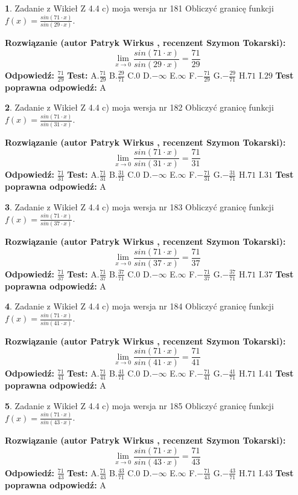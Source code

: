 \documentclass[12pt, a4paper]{article}
\theoremstyle{definition} %
\newtheorem{zad}{}
\newcommand{\zadStart}[1]{\begin{zad}#1\newline}
\newcommand{\zadStop}{\end{zad}}
\newcommand{\rozwStart}[2]{\noindent \textbf{Rozwiązanie (autor #1 , recenzent #2): }\newline}
\newcommand{\rozwStop}{\newline}
\newcommand{\odpStart}{\noindent \textbf{Odpowiedź:}\newline}
\newcommand{\odpStop}{\newline}
\newcommand{\testStart}{\noindent \textbf{Test:}\newline}
\newcommand{\testStop}{\newline}
\newcommand{\kluczStart}{\noindent \textbf{Test poprawna odpowiedź:}\newline}
\newcommand{\kluczStop}{\newline}
\begin{document}
\zadStart{Zadanie z Wikieł Z 4.4 c) moja wersja nr 181}
Obliczyć granicę funkcji $f(x)=\frac{sin(71\cdot x)}{sin(29\cdot x)}$.
\zadStop
\rozwStart{Patryk Wirkus}{Szymon Tokarski}
$$\lim\limits_{x\to 0}\frac{sin(71\cdot x)}{sin(29\cdot x)}=
\frac{71}{29}$$
\rozwStop
\odpStart
$\frac{71}{29}$
\odpStop
\testStart
A.$\frac{71}{29}$
B.$\frac{29}{71}$
C.$0$
D.$-\infty$
E.$\infty$
F.$-\frac{71}{29}$
G.$-\frac{29}{71}$
H.$71$
I.$29$
\testStop
\kluczStart
A
\kluczStop



\zadStart{Zadanie z Wikieł Z 4.4 c) moja wersja nr 182}
Obliczyć granicę funkcji $f(x)=\frac{sin(71\cdot x)}{sin(31\cdot x)}$.
\zadStop
\rozwStart{Patryk Wirkus}{Szymon Tokarski}
$$\lim\limits_{x\to 0}\frac{sin(71\cdot x)}{sin(31\cdot x)}=
\frac{71}{31}$$
\rozwStop
\odpStart
$\frac{71}{31}$
\odpStop
\testStart
A.$\frac{71}{31}$
B.$\frac{31}{71}$
C.$0$
D.$-\infty$
E.$\infty$
F.$-\frac{71}{31}$
G.$-\frac{31}{71}$
H.$71$
I.$31$
\testStop
\kluczStart
A
\kluczStop



\zadStart{Zadanie z Wikieł Z 4.4 c) moja wersja nr 183}
Obliczyć granicę funkcji $f(x)=\frac{sin(71\cdot x)}{sin(37\cdot x)}$.
\zadStop
\rozwStart{Patryk Wirkus}{Szymon Tokarski}
$$\lim\limits_{x\to 0}\frac{sin(71\cdot x)}{sin(37\cdot x)}=
\frac{71}{37}$$
\rozwStop
\odpStart
$\frac{71}{37}$
\odpStop
\testStart
A.$\frac{71}{37}$
B.$\frac{37}{71}$
C.$0$
D.$-\infty$
E.$\infty$
F.$-\frac{71}{37}$
G.$-\frac{37}{71}$
H.$71$
I.$37$
\testStop
\kluczStart
A
\kluczStop



\zadStart{Zadanie z Wikieł Z 4.4 c) moja wersja nr 184}
Obliczyć granicę funkcji $f(x)=\frac{sin(71\cdot x)}{sin(41\cdot x)}$.
\zadStop
\rozwStart{Patryk Wirkus}{Szymon Tokarski}
$$\lim\limits_{x\to 0}\frac{sin(71\cdot x)}{sin(41\cdot x)}=
\frac{71}{41}$$
\rozwStop
\odpStart
$\frac{71}{41}$
\odpStop
\testStart
A.$\frac{71}{41}$
B.$\frac{41}{71}$
C.$0$
D.$-\infty$
E.$\infty$
F.$-\frac{71}{41}$
G.$-\frac{41}{71}$
H.$71$
I.$41$
\testStop
\kluczStart
A
\kluczStop



\zadStart{Zadanie z Wikieł Z 4.4 c) moja wersja nr 185}
Obliczyć granicę funkcji $f(x)=\frac{sin(71\cdot x)}{sin(43\cdot x)}$.
\zadStop
\rozwStart{Patryk Wirkus}{Szymon Tokarski}
$$\lim\limits_{x\to 0}\frac{sin(71\cdot x)}{sin(43\cdot x)}=
\frac{71}{43}$$
\rozwStop
\odpStart
$\frac{71}{43}$
\odpStop
\testStart
A.$\frac{71}{43}$
B.$\frac{43}{71}$
C.$0$
D.$-\infty$
E.$\infty$
F.$-\frac{71}{43}$
G.$-\frac{43}{71}$
H.$71$
I.$43$
\testStop
\kluczStart
A
\kluczStop
\end{document}
